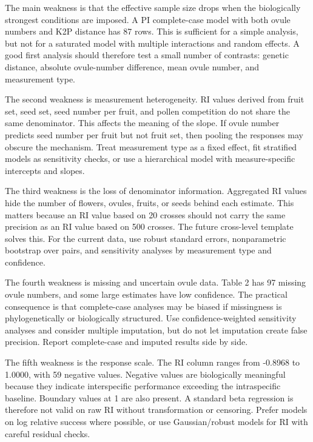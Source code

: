 \documentclass[11pt]{article}
\begin{document}
The main weakness is that the effective sample size drops when the biologically strongest conditions are imposed. A PI complete-case model with both ovule numbers and K2P distance has 87 rows. This is sufficient for a simple analysis, but not for a saturated model with multiple interactions and random effects. A good first analysis should therefore test a small number of contrasts: genetic distance, absolute ovule-number difference, mean ovule number, and measurement type.

The second weakness is measurement heterogeneity. RI values derived from fruit set, seed set, seed number per fruit, and pollen competition do not share the same denominator. This affects the meaning of the slope. If ovule number predicts seed number per fruit but not fruit set, then pooling the responses may obscure the mechanism. Treat measurement type as a fixed effect, fit stratified models as sensitivity checks, or use a hierarchical model with measure-specific intercepts and slopes.

The third weakness is the loss of denominator information. Aggregated RI values hide the number of flowers, ovules, fruits, or seeds behind each estimate. This matters because an RI value based on 20 crosses should not carry the same precision as an RI value based on 500 crosses. The future cross-level template solves this. For the current data, use robust standard errors, nonparametric bootstrap over pairs, and sensitivity analyses by measurement type and confidence.

The fourth weakness is missing and uncertain ovule data. Table 2 has 97 missing ovule numbers, and some large estimates have low confidence. The practical consequence is that complete-case analyses may be biased if missingness is phylogenetically or biologically structured. Use confidence-weighted sensitivity analyses and consider multiple imputation, but do not let imputation create false precision. Report complete-case and imputed results side by side.

The fifth weakness is the response scale. The RI column ranges from -0.8968 to 1.0000, with 59 negative values. Negative values are biologically meaningful because they indicate interspecific performance exceeding the intraspecific baseline. Boundary values at 1 are also present. A standard beta regression is therefore not valid on raw RI without transformation or censoring. Prefer models on log relative success where possible, or use Gaussian/robust models for RI with careful residual checks.
\end{document}
